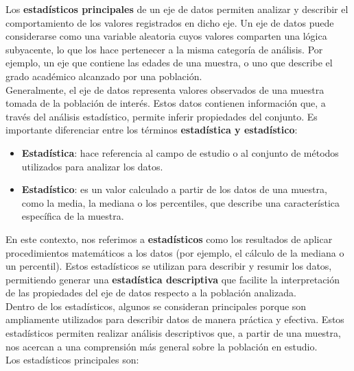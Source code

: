 \documentclass{article}
\begin{document}
Los \textbf{estadísticos principales} de un eje de datos permiten analizar y describir el comportamiento de los valores registrados en dicho eje. Un eje de datos puede considerarse como una variable aleatoria cuyos valores comparten una lógica subyacente, lo que los hace pertenecer a la misma categoría de análisis. Por ejemplo, un eje que contiene las edades de una muestra, o uno que describe el grado académico alcanzado por una población.
\\[12pt]
Generalmente, el eje de datos representa valores observados de una muestra tomada de la población de interés. Estos datos contienen información que, a través del análisis estadístico, permite inferir propiedades del conjunto. Es importante diferenciar entre los términos \textbf{estadística y estadístico}:
\begin{itemize}
    \item \textbf{Estadística}: hace referencia al campo de estudio o al conjunto de métodos utilizados para analizar los datos.
    \item \textbf{Estadístico}: es un valor calculado a partir de los datos de una muestra, como la media, la mediana o los percentiles, que describe una característica específica de la muestra.
\end{itemize}
En este contexto, nos referimos a \textbf{estadísticos} como los resultados de aplicar procedimientos matemáticos a los datos (por ejemplo, el cálculo de la mediana o un percentil). Estos estadísticos se utilizan para describir y resumir los datos, permitiendo generar una \textbf{estadística descriptiva} que facilite la interpretación de las propiedades del eje de datos respecto a la población analizada.
\\[12pt]
Dentro de los estadísticos, algunos se consideran principales porque son ampliamente utilizados para describir datos de manera práctica y efectiva. Estos estadísticos permiten realizar análisis descriptivos que, a partir de una muestra, nos acercan a una comprensión más general sobre la población en estudio.
\\[12pt]
Los estadísticos principales son:
\end{document}
